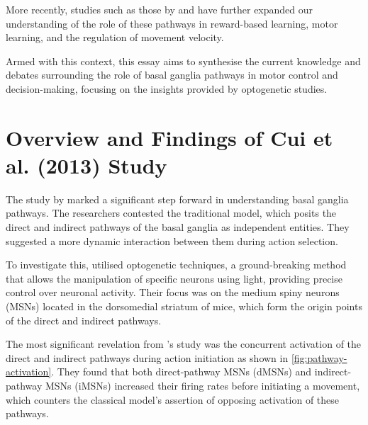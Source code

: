 \documentclass[10pt]{article}
\begin{document}
\begin{sloppypar}
  More recently, studies such as those by \cite{hilt_evidence_2016} and \cite{wang_direct_2015} have further expanded our understanding of the role of these pathways in reward-based learning, motor learning, and the regulation of movement velocity.

  Armed with this context, this essay aims to synthesise the current knowledge and debates surrounding the role of basal ganglia pathways in motor control and decision-making, focusing on the insights provided by optogenetic studies.

  \section{Overview and Findings of Cui et al. (2013) Study}
  \label{sec:cui-et-al-2013}

  The study by \cite{cui_concurrent_2013} marked a significant step forward in understanding basal ganglia pathways. The researchers contested the traditional model, which posits the direct and indirect pathways of the basal ganglia as independent entities. They suggested a more dynamic interaction between them during action selection.

  To investigate this, \cite{cui_concurrent_2013} utilised optogenetic techniques, a ground-breaking method that allows the manipulation of specific neurons using light, providing precise control over neuronal activity. Their focus was on the medium spiny neurons (MSNs) located in the dorsomedial striatum of mice, which form the origin points of the direct and indirect pathways.

  The most significant revelation from \cite{cui_concurrent_2013} ’s study was the concurrent activation of the direct and indirect pathways during action initiation as shown in \autoref{fig:pathway-activation}. They found that both direct-pathway MSNs (dMSNs) and indirect-pathway MSNs (iMSNs) increased their firing rates before initiating a movement, which counters the classical model’s assertion of opposing activation of these pathways.


\end{sloppypar}
\end{document}
